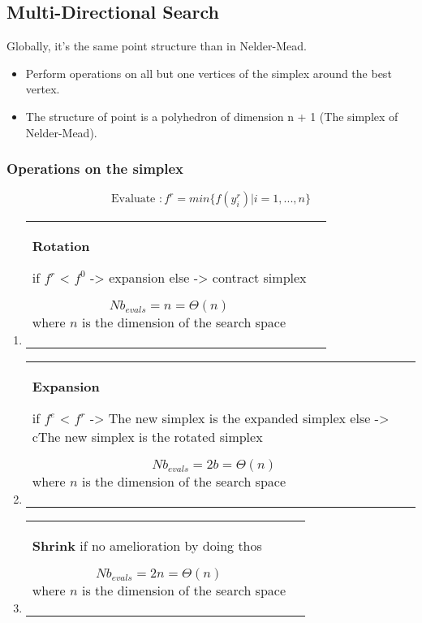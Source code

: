 \subsection{Multi-Directional Search}

Globally, it's the same point structure than in Nelder-Mead.
\begin{itemize}
    \item Perform operations on all but one vertices of the simplex around
        the best vertex.

    \item The structure of point is a polyhedron of dimension n + 1 (The
        simplex of Nelder-Mead).
\end{itemize}

\subsubsection{Operations on the simplex}
$$\textrm{Evaluate }: f^r = min \{ f(y_i^r) | i=1,...,n\}$$
\begin{enumerate}
    \item \begin{tabular}{m{9cm}m{3cm}}
            \textbf{Rotation } 

if $f^r$ < $f^0$ -> expansion\newline
else -> contract simplex \newline


            $$Nb_{evals} = n = \Theta(n)$$ where $n$ is the dimension
            of the search space
            & 
        \end{tabular}

    \item \begin{tabular}{m{9cm}m{3cm}}
            \textbf{Expansion } 

if $f^e$ < $f^r$ -> The new simplex is the expanded simplex\newline
else -> cThe new simplex is the rotated simplex \newline

            $$Nb_{evals} = 2b = \Theta(n)$$ where $n$ is the dimension
            of the search space
            & 
        \end{tabular}

    \item \begin{tabular}{m{9cm}m{3cm}}
            \textbf{Shrink} if no amelioration by doing thos 

            $$Nb_{evals} = 2n = \Theta(n)$$ where $n$ is the dimension
            of the search space
            & 
        \end{tabular}
\end{enumerate}



